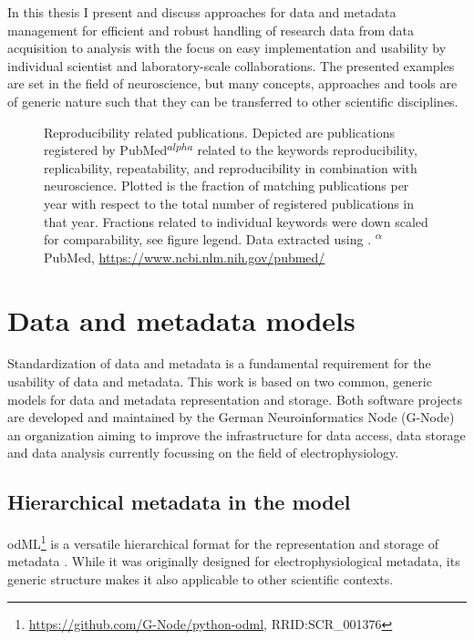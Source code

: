 In this thesis I present and discuss approaches for data and metadata management for efficient and robust handling of research data from data acquisition to analysis with the focus on easy implementation and usability by individual scientist and laboratory-scale collaborations. The presented examples are set in the field of neuroscience, but many concepts, approaches and tools are of generic nature such that they can be transferred to other scientific disciplines. 


\begin{figure}
 \centering
 
 \caption[Reproducibility related publications]{Reproducibility related publications. Depicted  are publications registered by PubMed\textsuperscript{$alpha$} related to the keywords reproducibility, replicability, repeatability, and reproducibility in combination with neuroscience. Plotted is the fraction of matching publications per year with respect to the total number of registered publications in that year. Fractions related to individual keywords were down scaled for comparability, see figure legend. Data extracted using \citet{Corlan_2004}. \small\textsuperscript{$\alpha$} PubMed, \url{https://www.ncbi.nlm.nih.gov/pubmed/}}
 \label{fig:intro_reproducibility}
\end{figure}

\section{Data and metadata models}
Standardization of data and metadata is a fundamental requirement for the usability of data and metadata. This work is based on two common, generic models for data and metadata representation and storage. Both software projects are developed and maintained by the German Neuroinformatics Node (G-Node) an organization aiming to improve the infrastructure for data access, data storage and data analysis currently focussing on the field of electrophysiology.

\subsection{Hierarchical metadata in the  model}
\label{sec:odml}

odML\footnote{\url{https://github.com/G-Node/python-odml}, RRID:SCR\_001376} is a versatile hierarchical format for the representation and storage of metadata \citep{Grewe_2011}. While it was originally designed for electrophysiological metadata, its generic structure makes it also applicable to other scientific contexts.\\

